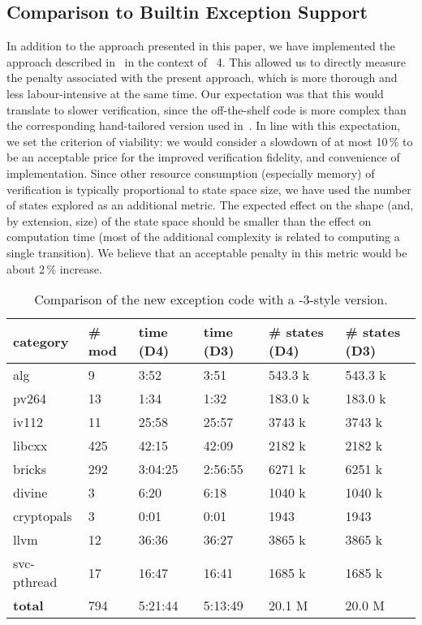 \subsection{Comparison to Builtin Exception Support}\label{sec:lang:cmpD3}

In addition to the approach presented in this paper, we have implemented
the approach described in~ in the context
of \divine{}~4. This allowed us to directly measure the penalty associated
with the present approach, which is more thorough and less
labour-intensive at the same time. Our expectation was that this would
translate to slower verification, since the off-the-shelf code is more
complex than the corresponding hand-tailored version used
in~. In line with this expectation, we set
the criterion of viability: we would consider a slowdown of at most
10\,\% to be an acceptable price for the improved verification fidelity,
and convenience of implementation. Since other resource consumption
(especially memory) of verification is typically proportional to state
space size, we have used the number of states explored as an additional
metric. The expected effect on the shape (and, by extension, size) of
the state space should be smaller than the effect on computation time
(most of the additional complexity is related to computing a single
transition). We believe that an acceptable penalty in this metric would
be about 2\,\% increase.

\begin{table}[tp]
\caption{\label{tbl:D4D3}Comparison of the new exception code with a
\divine{}-3-style version. }
\begin{tabularx}{\textwidth}{llLLLL}
\toprule
category & \# mod & time (D4) & time (D3) & \# states (D4) & \# states
(D3)\\
\midrule
alg & 9 & 3:52 & 3:51 & 543.3 k & 543.3 k\\
pv264 & 13 & 1:34 & 1:32 & 183.0 k & 183.0 k\\
iv112 & 11 & 25:58 & 25:57 & 3743 k & 3743 k\\
libcxx & 425 & 42:15 & 42:09 & 2182 k & 2182 k\\
bricks & 292 & 3:04:25 & 2:56:55 & 6271 k & 6251 k\\
divine & 3 & 6:20 & 6:18 & 1040 k & 1040 k\\
cryptopals & 3 & 0:01 & 0:01 & 1943 & 1943\\
llvm & 12 & 36:36 & 36:27 & 3865 k & 3865 k\\
svc-pthread & 17 & 16:47 & 16:41 & 1685 k & 1685 k\\
\textbf{total} & 794 & 5:21:44 & 5:13:49 & 20.1 M & 20.0 M\\
\bottomrule
\end{tabularx}
\end{table}

